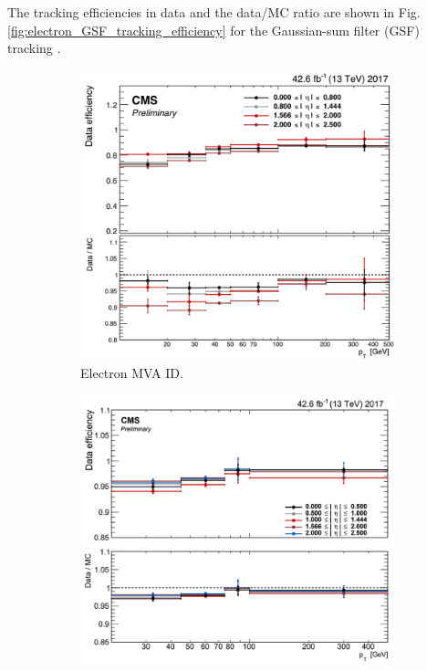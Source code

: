 The tracking efficiencies in data and the data/MC ratio are shown in Fig. \ref{fig:electron_GSF_tracking_efficiency} for the Gaussian-sum filter (GSF) tracking \cite{CMS-DP-2020-037}. 

\begin{figure}[h]
    \centering
    \begin{subfigure}{0.45\textwidth}
        \includegraphics[width=1.0\textwidth]{figures/ch-5-object-reconstruction-and-corrections-applied/electron_MVA_90wp_identification_efficiency}
        \caption{Electron MVA ID.}
        \label{fig:electron_MVA_ID_efficiency}
    \end{subfigure}
    \hfill
    \begin{subfigure}{0.45\textwidth}
        \includegraphics[width=1.0\textwidth]{figures/ch-5-object-reconstruction-and-corrections-applied/electron_gsf_tracking_efficiency}

\end{subfigure}
\end{figure}
